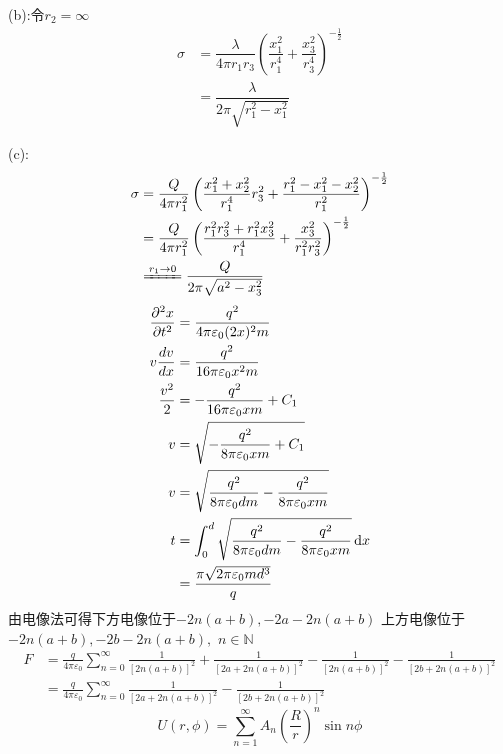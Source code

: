(b):令$r_2=\infty$
\begin{align*}
    \sigma&=\dfrac{\lambda}{4\pi r_1r_3}\left(\dfrac{x_1^2}{r_1^4}+\dfrac{x_3^2}{r_3^4}\right)^{-\frac{1}{2}}\\
    &=\dfrac{\lambda}{2\pi \sqrt{r_1^2-x_1^2}}
\end{align*}

(c):
\begin{align*}
    \sigma&=\dfrac{Q}{4\pi r_1^2}\left(\dfrac{x_1^2+x_2^2}{r_1^4}r_3^2+\dfrac{r_1^2-{x_1^2-x_2^2}}{r_1^2}\right)^{-\frac{1}{2}}\\
    &=\dfrac{Q}{4\pi r_1^2}\left(\dfrac{r_1^2r_3^2+r_1^2x_3^2}{r_1^4}+\dfrac{x_3^2}{r_1^2r_3^2}\right)^{-\frac{1}{2}}\\
    &\xlongequal{r_1\rightarrow 0}\dfrac{Q}{2\pi \sqrt{a^2-x_3^2}}
\end{align*}
\begin{align*}
    \frac{\partial^2 x}{\partial t^2}&=\frac{q^2}{4\pi\varepsilon_0(2x)^2m}\\
    v\frac{dv}{dx}&=\frac{q^2}{16\pi\varepsilon_0x^2m}\\
    \frac{v^2}{2}&=-\frac{q^2}{16\pi\varepsilon_0xm}+C_1\\
    v&=\sqrt{-\frac{q^2}{8\pi\varepsilon_0xm}+C_1}\\
    v&=\sqrt{\frac{q^2}{8\pi\varepsilon_0dm}-\frac{q^2}{8\pi\varepsilon_0xm}}\\
    t&=\int_{0}^{d}\sqrt{\frac{q^2}{8\pi\varepsilon_0dm}-\frac{q^2}{8\pi\varepsilon_0xm}}\dif x\\
    & = \dfrac{\pi \sqrt{2\pi\varepsilon_0 m d^3}}{q}
\end{align*}
由电像法可得下方电像位于$-2n(a+b),-2a-2n(a+b)$
上方电像位于$-2n(a+b),-2b-2n(a+b),\, \,n\in \mathbb N$
\begin{align*}
    F&=\frac{q}{4\pi\varepsilon_0}\sum_{n=0}^{\infty}\frac{1}{[2n(a+b)]^2}
    +\frac{1}{[2a+2n(a+b)]^2}
    -\frac{1}{[2n(a+b)]^2}
    -\frac{1}{[2b+2n(a+b)]^2}\\
    &=\frac{q}{4\pi\varepsilon_0}\sum_{n=0}^{\infty}
    \frac{1}{[2a+2n(a+b)]^2}
    -\frac{1}{[2b+2n(a+b)]^2}
\end{align*}
\[
U(r,\phi)=\sum_{n=1}^{\infty}A_n
\left(\frac{R}{r}\right)^n
\sin n\phi
\]



